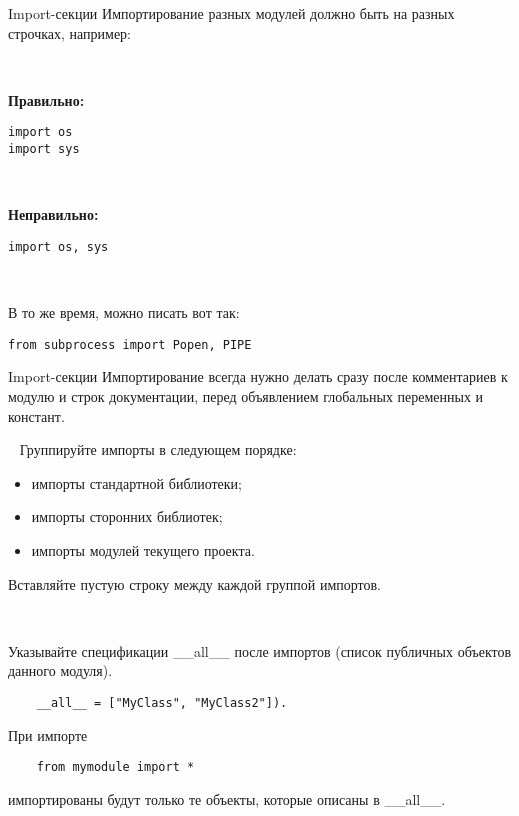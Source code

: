 \documentclass[xcolor=table]{beamer}
\begin{document}
\begin{frame}[fragile]{Import-секции}
	Импортирование разных модулей должно быть на разных строчках, например:
	
	~
	
	\textbf{Правильно:}
	\begin{verbatim}
import os
import sys	
	\end{verbatim}
	
	~
	
	\textbf{Неправильно:}
	\begin{verbatim}
import os, sys	
	\end{verbatim}

	~	
	
	В то же время, можно писать вот так:
	\begin{verbatim}
from subprocess import Popen, PIPE
	\end{verbatim}
\end{frame}

\begin{frame}[fragile]{Import-секции}
	Импортирование всегда нужно делать сразу после комментариев к модулю и строк документации, перед объявлением глобальных переменных и констант.

	~
	Группируйте импорты в следующем порядке:
	\begin{itemize}
		\item импорты стандартной библиотеки;
		\item импорты сторонних библиотек;
		\item импорты модулей текущего проекта.
	\end{itemize}
	Вставляйте пустую строку между каждой группой импортов.

	~
	
	Указывайте спецификации \_\_all\_\_ после импортов (список публичных объектов данного модуля).
	\begin{verbatim}
	__all__ = ["MyClass", "MyClass2"]).
	\end{verbatim}
	При импорте 
	\begin{verbatim}
	from mymodule import * 
	\end{verbatim}
	импортированы будут только те объекты, которые описаны в \_\_all\_\_.
\end{frame}
\end{document}
